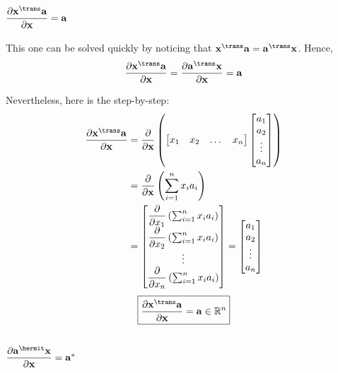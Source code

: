 \subsection{\(\dfrac{\partial \mathbf{x}^\trans  \mathbf{a}}{\partial \mathbf{x}} = \mathbf{a}\)}

This one can be solved quickly by noticing that \(\mathbf{x}^\trans  \mathbf{a} = \mathbf{a}^\trans  \mathbf{x}\). Hence,
\begin{align}
    \dfrac{\partial \mathbf{x}^\trans  \mathbf{a}}{\partial \mathbf{x}} = \dfrac{\partial \mathbf{a}^\trans  \mathbf{x}}{\partial \mathbf{x}} = \mathbf{a}
\end{align}

Nevertheless, here is the step-by-step:
\begin{align}
    \dfrac{\partial \mathbf{x}^\trans \mathbf{a}}{\partial \mathbf{x}} &= \dfrac{\partial}{\partial \mathbf{x}} \left(
    \begin{bmatrix}
        x_1 & x_2 & \dots & x_n
    \end{bmatrix} \begin{bmatrix}
        a_{1} \\ a_{2} \\ \vdots \\ a_{n}
    \end{bmatrix} \right) \\
    & = \dfrac{\partial}{\partial \mathbf{x}} \left( \sum_{i = 1}^n x_ia_i \right) \\
    & = \begin{bmatrix}
        \dfrac{\partial}{\partial x_1} \left( \sum_{i = 1}^n x_ia_i \right) \\ \dfrac{\partial}{\partial x_2} \left( \sum_{i = 1}^n x_ia_i \right) \\ \vdots \\ \dfrac{\partial}{\partial x_n} \left( \sum_{i = 1}^n x_ia_i \right) 
    \end{bmatrix} 
    = \begin{bmatrix}
        a_1 \\ a_2 \\ \vdots \\ a_n
    \end{bmatrix}
\end{align}
\begin{align}
    \boxed{\dfrac{\partial \mathbf{x}^\trans \mathbf{a}}{\partial \mathbf{x}} = \mathbf{a} \in \mathbb{R}^{n}}
\end{align}

\subsection{\(\dfrac{\partial \mathbf{a}^\hermit  \mathbf{x}}{\partial \mathbf{x}} = \mathbf{a}^*\)}

